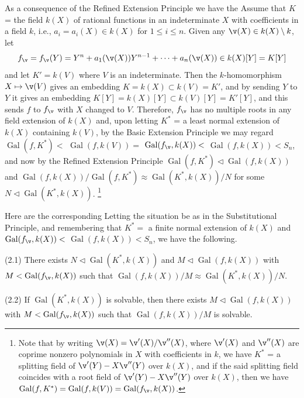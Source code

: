 As a consequence of the Refined Extension Principle we 
have the
{}
Assume that $K$ = the field $k(X)$ of rational functions 
in an
indeterminate $X$ with coefficients in a field $k$, i.e., 
$a_i=a_i(X)\in k(X)$
for $1\le i\le n$. Given any $\v(X)\in k(X)\setminus k$, let
$$
f_{\v}=f_{\v}(Y)= Y^n+a_1(\v(X))Y^{n-1}+\dots+
a_n(\v(X))\in k(X)[Y]=K[Y]
$$ 
and let $K'=k(V)$ where $V$ is an indeterminate.
Then the $k$-homomorphism $X\mapsto\v(V)$ gives an embedding
$K=k(X)\subset k(V)=K'$, and by sending $Y$ to $Y$ it 
gives an embedding
$K[Y]=k(X)[Y]\subset k(V)[Y]=K'[Y]$, and this sends $f$ to 
$f_{\v}$ with 
$X$ changed to $V$. Therefore,
$f_{\v}$ has no multiple roots in any field extension of 
$k(X)$ and,
upon letting $K^*$ = a least normal extension of $k(X)$ 
containing $k(V)$,
by the Basic Extension Principle we may regard
$\operatorname{Gal}(f,K^*)<$ $\operatorname{Gal}(f,k(V))=$ 
$\operatorname{Gal}(f_{\v},k(X))<$
$\operatorname{Gal}(f,k(X))<S_n$, and now by the Refined 
Extension Principle
$\operatorname{Gal}(f,K^*)\triangleleft%
\operatorname{Gal}(f,k(X))$ and 
$\operatorname{Gal}(f,k(X))/\operatorname{Gal}(f,K^*)%
\approx\operatorname{Gal}(K^*,k(X))/N$
for some $N\triangleleft\operatorname{Gal}(K^*,k(X))$.
\footnote{Note that by writing $\v(X)=\v'(X)/\v''(X)$, 
where $\v'(X)$ 
and $\v''(X)$ are coprime nonzero polynomials in $X$ with 
coefficients in $k$,
we have $K^*$ = a splitting field of $\v'(Y)-X\v''(Y)$ 
over $k(X)$, and
if the said splitting field coincides with a root field of
$\v'(Y)-X\v''(Y)$ over $k(X)$, then we have
$\operatorname{Gal}(f,K^*)=\operatorname{Gal}(f,k(V))=%
\operatorname{Gal}(f_{\v},k(X))$.}
\ethm

Here are the corresponding
Letting the situation be as in the Substitutional 
Principle, and remembering
that $K^*=$ a finite normal extension of $k(X)$ and 
$\operatorname{Gal}(f_{\v},k(X))<$ 
$\operatorname{Gal}(f,k(X))<S_n$, 
we have the following. 

{\rm(2.1)} There exists 
$N\triangleleft\operatorname{Gal}(K^*,k(X))$ and
$M\triangleleft\operatorname{Gal}(f,k(X))$ with 
$M<\operatorname{Gal}(f_{\v},k(X))$ such that
$\operatorname{Gal}(f,k(X))/M\approx%
\operatorname{Gal}(K^*,k(X))/N$.

{\rm(2.2)} If $\operatorname{Gal}(K^*,k(X))$ is solvable, 
then there exists 
$M\triangleleft\operatorname{Gal}(f,k(X))$ with 
$M<\operatorname{Gal}(f_{\v},k(X))$ such that
$\operatorname{Gal}(f,k(X))/M$ is solvable.

